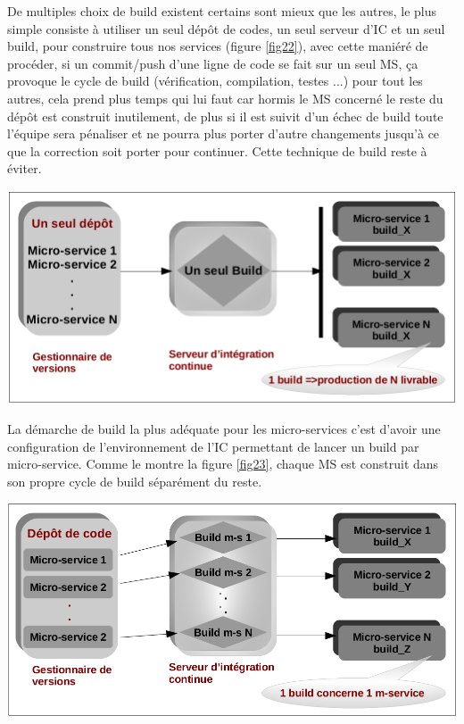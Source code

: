 \documentclass[12pt, a4paper, openany]{report}
\begin{document}
\begin{appendices}
  De multiples choix de build existent certains sont mieux que les autres, le plus simple consiste à utiliser un seul dépôt de codes, un seul serveur d'IC et un seul build, pour construire tous nos services (figure \ref{fig22}), avec cette maniéré de procéder, si un commit/push d'une ligne de code se fait sur un seul MS, ça provoque le cycle de build (vérification, compilation, testes ...) pour tout les autres, cela prend plus temps qui lui faut car hormis le MS concerné le reste du dépôt est construit inutilement, de plus si il est suivit d'un échec de build toute l’équipe sera pénaliser et ne pourra plus porter d'autre changements jusqu'à ce que la correction soit porter pour continuer. Cette technique de build reste à éviter.\\
  
  \begin{center}
    \includegraphics[scale=0.3]{itegra_conti_1_22.png}
    \label{fig22}
  \end{center} 
  
  La démarche de build la plus adéquate pour les micro-services c'est d'avoir une configuration de l’environnement de l'IC permettant de lancer un build par micro-service. Comme le montre la figure \ref{fig23}, chaque MS est construit dans son propre cycle de build séparément du reste.
  
  \begin{center}
    \includegraphics[scale=0.32]{itegra_conti_2_23.png}
    \label{fig23}
  \end{center} 
 

\end{appendices}
\end{document}
